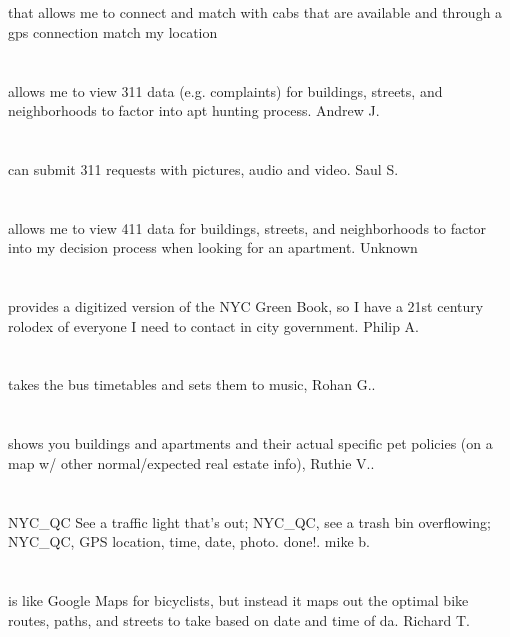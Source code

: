 \section{}    that allows me to connect and match with cabs that are available and through a gps connection match my location 
\section{}allows me to view 311 data (e.g. complaints) for buildings,  streets,  and neighborhoods to factor into apt hunting process.  Andrew J.
\section{}can submit 311 requests with pictures,  audio and video.  Saul S.
\section{}allows me to view 411 data for buildings,  streets,  and neighborhoods to factor into my decision process when looking for an apartment.  Unknown
\section{}provides a digitized version of the NYC Green Book,  so I have a 21st century rolodex of everyone I need to contact in city government. Philip A.
\section{}takes the bus timetables and sets them to music, Rohan G.. \index{}
\section{}shows you buildings and apartments and their actual specific pet policies (on a map w/ other normal/expected real estate info), Ruthie V.. \index{}
\section{}NYC\_QC  See a traffic light that's out; NYC\_QC,  see a trash bin overflowing; NYC\_QC,   GPS location,  time,  date,  photo. done!. mike b.
\section{}is like Google Maps for bicyclists,  but instead it maps out the optimal bike routes,  paths,  and streets to take based on date and time of da. Richard T.

